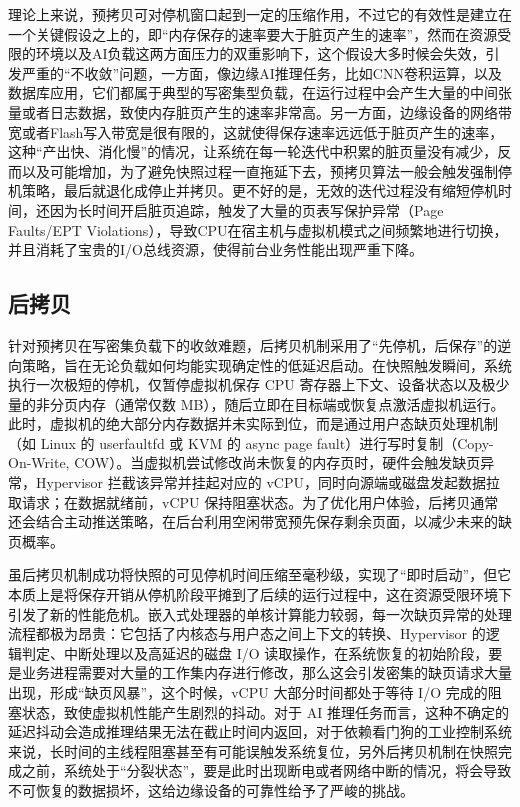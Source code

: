 理论上来说，预拷贝可对停机窗口起到一定的压缩作用，不过它的有效性是建立在一个关键假设之上的，即“内存保存的速率要大于脏页产生的速率”，然而在资源受限的环境以及AI负载这两方面压力的双重影响下，这个假设大多时候会失效，引发严重的“不收敛”问题，一方面，像边缘AI推理任务，比如CNN卷积运算，以及数据库应用，它们都属于典型的写密集型负载，在运行过程中会产生大量的中间张量或者日志数据，致使内存脏页产生的速率非常高\cite{gobieski2019intelligence}。另一方面，边缘设备的网络带宽或者Flash写入带宽是很有限的，这就使得保存速率远远低于脏页产生的速率，这种“产出快、消化慢”的情况，让系统在每一轮迭代中积累的脏页量没有减少，反而以及可能增加，为了避免快照过程一直拖延下去，预拷贝算法一般会触发强制停机策略，最后就退化成停止并拷贝。更不好的是，无效的迭代过程没有缩短停机时间，还因为长时间开启脏页追踪，触发了大量的页表写保护异常（Page Faults/EPT Violations），导致CPU在宿主机与虚拟机模式之间频繁地进行切换，并且消耗了宝贵的I/O总线资源，使得前台业务性能出现严重下降\cite{shi2022memory}。

\subsection{后拷贝}

针对预拷贝在写密集负载下的收敛难题，后拷贝机制采用了“先停机，后保存”的逆向策略，旨在无论负载如何均能实现确定性的低延迟启动\cite{hines2009post}。在快照触发瞬间，系统执行一次极短的停机，仅暂停虚拟机保存 CPU 寄存器上下文、设备状态以及极少量的非分页内存（通常仅数 MB），随后立即在目标端或恢复点激活虚拟机运行。此时，虚拟机的绝大部分内存数据并未实际到位，而是通过用户态缺页处理机制（如 Linux 的 userfaultfd 或 KVM 的 async page fault）进行写时复制（Copy-On-Write, COW）\cite{wang2014vm}。当虚拟机尝试修改尚未恢复的内存页时，硬件会触发缺页异常，Hypervisor 拦截该异常并挂起对应的 vCPU，同时向源端或磁盘发起数据拉取请求；在数据就绪前，vCPU 保持阻塞状态。为了优化用户体验，后拷贝通常还会结合主动推送策略，在后台利用空闲带宽预先保存剩余页面，以减少未来的缺页概率。

虽后拷贝机制成功将快照的可见停机时间压缩至毫秒级，实现了“即时启动”，但它本质上是将保存开销从停机阶段平摊到了后续的运行过程中，这在资源受限环境下引发了新的性能危机\cite{shi2022memory}。嵌入式处理器的单核计算能力较弱，每一次缺页异常的处理流程都极为昂贵：它包括了内核态与用户态之间上下文的转换、Hypervisor 的逻辑判定、中断处理以及高延迟的磁盘 I/O 读取操作，在系统恢复的初始阶段，要是业务进程需要对大量的工作集内存进行修改，那么这会引发密集的缺页请求大量出现，形成“缺页风暴”，这个时候，vCPU 大部分时间都处于等待 I/O 完成的阻塞状态，致使虚拟机性能产生剧烈的抖动。对于 AI 推理任务而言，这种不确定的延迟抖动会造成推理结果无法在截止时间内返回，对于依赖看门狗的工业控制系统来说，长时间的主线程阻塞甚至有可能误触发系统复位，另外后拷贝机制在快照完成之前，系统处于“分裂状态”，要是此时出现断电或者网络中断的情况，将会导致不可恢复的数据损坏，这给边缘设备的可靠性给予了严峻的挑战\cite{li2014consnap}。

